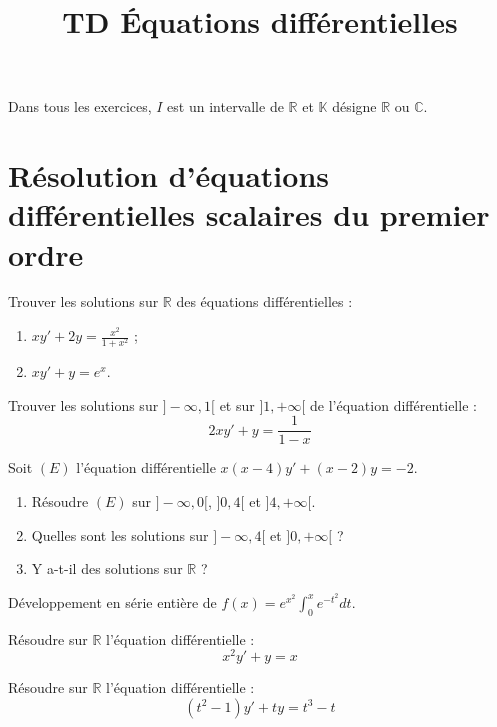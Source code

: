 \documentclass[french,a4paper]{article}
\title{TD Équations différentielles}
\newcommand{\R}{\mathbb{R}}
\newcommand{\C}{\mathbb{C}}
\newcommand{\K}{\mathbb{K}}
\theoremstyle{plain}
\theoremstyle{definition}
\theoremstyle{remark}
\begin{document}
\maketitle

Dans tous les exercices, $I$ est un intervalle de $\R$ et $\K$ désigne $\R$ ou $\C$.

\section{Résolution d'équations différentielles scalaires du premier ordre}

\begin{ex}[Moulin.ED.01]{}
	Trouver les solutions sur $\R$ des équations différentielles :
	\begin{enumerate}
		\item $xy'+2y=\displaystyle\frac{x^2}{1+x^2}$ ;
		\item $xy'+y=e^x$.
	\end{enumerate}
\end{ex}

\begin{ex}[Moulin.ED.02]{}
	Trouver les solutions sur $]-\infty,1[$ et sur $]1,+\infty[$ de l'équation différentielle : $$2xy'+y=\frac{1}{1-x}$$
\end{ex}

\begin{ex}[Moulin.ED.03]{}
	Soit $(E)$ l'équation différentielle $x(x-4)y'+(x-2)y=-2$.
	\begin{enumerate}
		\item Résoudre $(E)$ sur $]-\infty,0[$, $]0,4[$ et $]4,+\infty[$.
		\item Quelles sont les solutions sur $]-\infty,4[$ et $]0,+\infty[$ ?
		\item Y a-t-il des solutions sur $\R$ ?
	\end{enumerate}
\end{ex}

\begin{ex}[Moulin.ED.04]{}
	Développement en série entière de $f(x)=\displaystyle e^{x^2}\int_{0}^{x}e^{-t^2}dt$.
\end{ex}

\begin{ex}[Moulin.ED.05]{}
	Résoudre sur $\R$ l'équation différentielle : $$x^2y'+y=x$$
\end{ex}

\begin{ex}[Moulin.ED.06]{}
	Résoudre sur $\R$ l'équation différentielle : $$(t^2-1)y'+ty=t^3-t$$
\end{ex}
\end{document}
